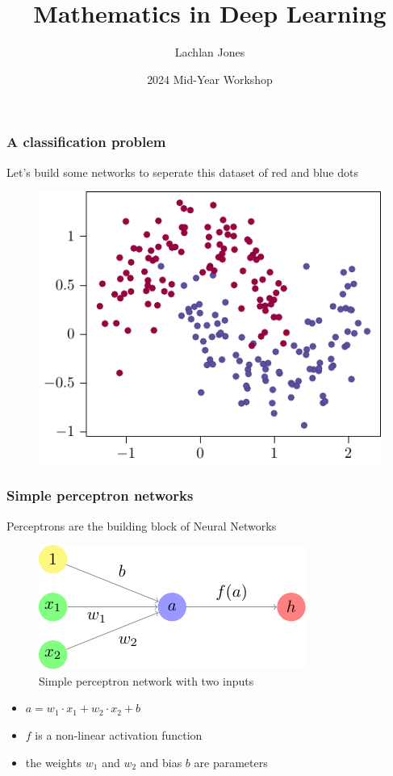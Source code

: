 \documentclass{beamer}
\title{Mathematics in Deep Learning}
\author{Lachlan Jones}
\institute{MATH199}
\date{2024 Mid-Year Workshop}
\begin{document}
\frame{\titlepage}

\begin{frame}
    \frametitle{A classification problem}
    Let's build some networks to seperate this dataset of red and blue dots
    \begin{figure}
        \centering
        \includegraphics{./figures/moons/main.pdf}
    \end{figure}
\end{frame}

\begin{frame}
    \frametitle{Simple perceptron networks}
    Perceptrons are the building block of Neural Networks
    \begin{figure}
        \centering
        \includegraphics{./figures/simple-perceptron/main.pdf}
        \caption{Simple perceptron network with two inputs}
    \end{figure} \pause
    \begin{itemize}
        \item \(a = w_1 \cdot x_1 + w_2 \cdot x_2 + b\) \pause
        \item \(f\) is a \alert{non-linear activation function} \pause
        \item the weights \(w_1\) and \(w_2\) and bias \(b\) are \alert{parameters}
    \end{itemize}
\end{frame}
\end{document}
